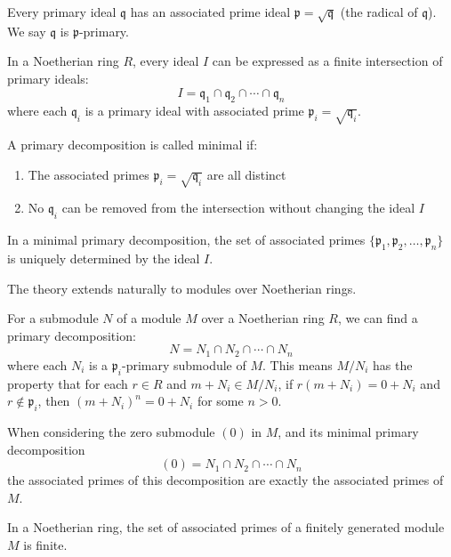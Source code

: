 \documentclass[12pt]{article}
\begin{document}
Every primary ideal $\mathfrak{q}$ has an associated prime ideal $\mathfrak{p} = \sqrt{\mathfrak{q}}$ (the radical of $\mathfrak{q}$). We say $\mathfrak{q}$ is $\mathfrak{p}$-primary.

\begin{theorem}
    In a Noetherian ring $R$, every ideal $I$ can be expressed as a finite intersection of primary ideals:
    \[
        I = \mathfrak{q}_1 \cap \mathfrak{q}_2 \cap \cdots \cap \mathfrak{q}_n
    \]
    where each $\mathfrak{q}_i$ is a primary ideal with associated prime $\mathfrak{p}_i = \sqrt{\mathfrak{q}_i}$.
\end{theorem}

\begin{definition}
    A primary decomposition is called minimal if:
    \begin{enumerate}[label=(\roman*)]
        \item The associated primes $\mathfrak{p}_i = \sqrt{\mathfrak{q}_i}$ are all distinct
        \item No $\mathfrak{q}_i$ can be removed from the intersection without changing the ideal $I$
    \end{enumerate}
\end{definition}

\begin{proposition}
    In a minimal primary decomposition, the set of associated primes $\{\mathfrak{p}_1, \mathfrak{p}_2, \ldots, \mathfrak{p}_n\}$ is uniquely determined by the ideal $I$.
\end{proposition}
The theory extends naturally to modules over Noetherian rings.
\begin{theorem}
    For a submodule $N$ of a module $M$ over a Noetherian ring $R$, we can find a primary decomposition:
    \[
        N = N_1 \cap N_2 \cap \cdots \cap N_n
    \]
    where each $N_i$ is a $\mathfrak{p}_i$-primary submodule of $M$. This means $M/N_i$ has the property that for each $r \in R$ and $m + N_i \in M/N_i$, if $r(m + N_i) = 0 + N_i$ and $r \not\in \mathfrak{p}_i$, then $(m + N_i)^n = 0 + N_i$ for some $n > 0$.
\end{theorem}

When considering the zero submodule $(0)$ in $M$, and its minimal primary decomposition \[(0) = N_1 \cap N_2 \cap \cdots \cap N_n\] the associated primes of this decomposition are exactly the associated primes of $M$.

\begin{theorem}
    In a Noetherian ring, the set of associated primes of a finitely generated module $M$ is finite.
\end{theorem}
\end{document}
